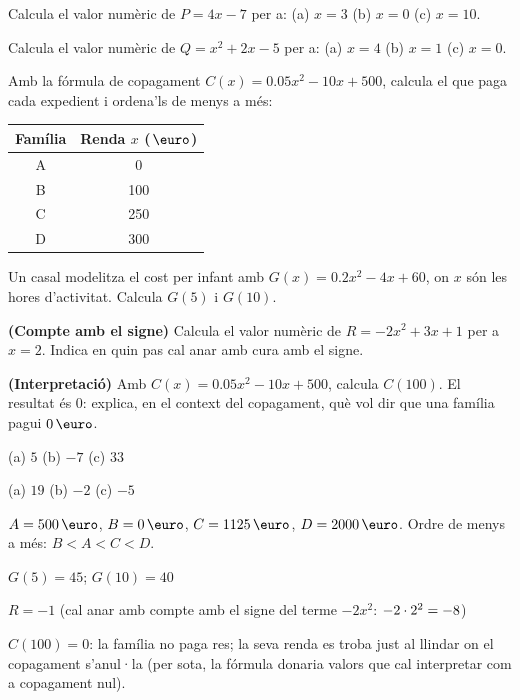 \begin{exercicis}
\begin{exlist}
  \item Calcula el valor numèric de $P = 4x - 7$ per a:
        \quad (a) $x=3$ \quad (b) $x=0$ \quad (c) $x=10$.
  \item Calcula el valor numèric de $Q = x^2 + 2x - 5$ per a:
        \quad (a) $x=4$ \quad (b) $x=1$ \quad (c) $x=0$.
  \item Amb la fórmula de copagament $C(x)=\num{0,05}x^2-10x+500$, calcula el que
        paga cada expedient i ordena'ls de menys a més:
    \begin{center}
    \begin{tabular}{c c}
    \toprule
    Família & Renda $x$ ($\eur$) \\
    \midrule
    A & 0 \\
    B & 100 \\
    C & 250 \\
    D & 300 \\
    \bottomrule
    \end{tabular}
    \end{center}
  \item Un casal modelitza el cost per infant amb $G(x) = \num{0,2}x^2 - 4x + 60$,
        on $x$ són les hores d'activitat. Calcula $G(5)$ i $G(10)$.
  \item \textbf{(Compte amb el signe)} Calcula el valor numèric de
        $R = -2x^2 + 3x + 1$ per a $x=2$. Indica en quin pas cal anar amb cura
        amb el signe.
  \item \textbf{(Interpretació)} Amb $C(x)=\num{0,05}x^2-10x+500$, calcula
        $C(100)$. El resultat és $0$: explica, en el context del copagament,
        què vol dir que una família pagui $0\eur$.
\end{exlist}
\end{exercicis}

\begin{solucions}
\begin{sollist}
  \item (a) $5$ \quad (b) $-7$ \quad (c) $33$
  \item (a) $19$ \quad (b) $-2$ \quad (c) $-5$
  \item $A=500\eur$, \;$B=0\eur$, \;$C=\num{1125}\eur$, \;$D=\num{2000}\eur$. \;
        Ordre de menys a més: $B<A<C<D$.
  \item $G(5)=45$; \quad $G(10)=40$
  \item $R=-1$ \;(cal anar amb compte amb el signe del terme $-2x^2$:
        $-2\cdot 2^2=-8$)
  \item $C(100)=0$: la família no paga res; la seva renda es troba just al
        llindar on el copagament s'anul·la (per sota, la fórmula donaria
        valors que cal interpretar com a copagament nul).
\end{sollist}
\end{solucions}
